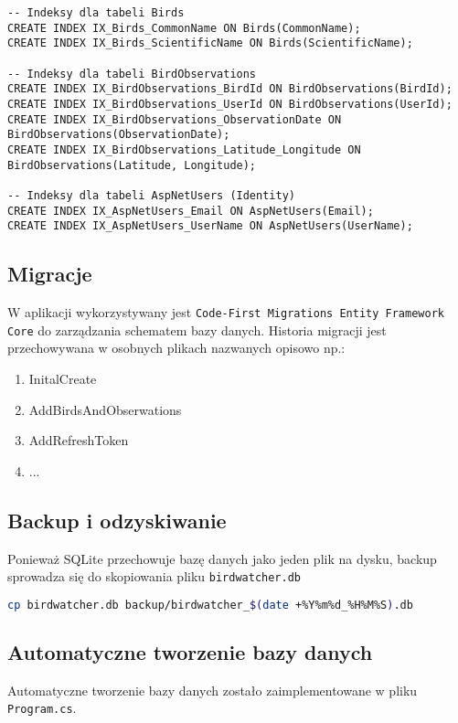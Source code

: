 \begin{lstlisting}[style=sqlstyle, caption={Indeksy bazy danych}]
-- Indeksy dla tabeli Birds
CREATE INDEX IX_Birds_CommonName ON Birds(CommonName);
CREATE INDEX IX_Birds_ScientificName ON Birds(ScientificName);

-- Indeksy dla tabeli BirdObservations
CREATE INDEX IX_BirdObservations_BirdId ON BirdObservations(BirdId);
CREATE INDEX IX_BirdObservations_UserId ON BirdObservations(UserId);
CREATE INDEX IX_BirdObservations_ObservationDate ON BirdObservations(ObservationDate);
CREATE INDEX IX_BirdObservations_Latitude_Longitude ON BirdObservations(Latitude, Longitude);

-- Indeksy dla tabeli AspNetUsers (Identity)
CREATE INDEX IX_AspNetUsers_Email ON AspNetUsers(Email);
CREATE INDEX IX_AspNetUsers_UserName ON AspNetUsers(UserName);
\end{lstlisting}

\subsection{Migracje}
W aplikacji wykorzystywany jest \texttt{Code-First Migrations Entity Framework Core} do zarządzania schematem bazy danych.
Historia migracji jest przechowywana w osobnych plikach nazwanych opisowo np.:
\begin{enumerate}
	\item InitalCreate
	\item AddBirdsAndObserwations
	\item AddRefreshToken
	\item ...
\end{enumerate}

\subsection{Backup i odzyskiwanie}
Ponieważ SQLite przechowuje bazę danych jako jeden plik na dysku, backup sprowadza się do skopiowania pliku \texttt{birdwatcher.db}

\begin{lstlisting}[language=bash, caption={Przykład skryptu kopiującego w bash}]
cp birdwatcher.db backup/birdwatcher_$(date +%Y%m%d_%H%M%S).db
\end{lstlisting}

\subsection{Automatyczne tworzenie bazy danych}
Automatyczne tworzenie bazy danych zostało zaimplementowane w pliku \texttt{Program.cs}.


